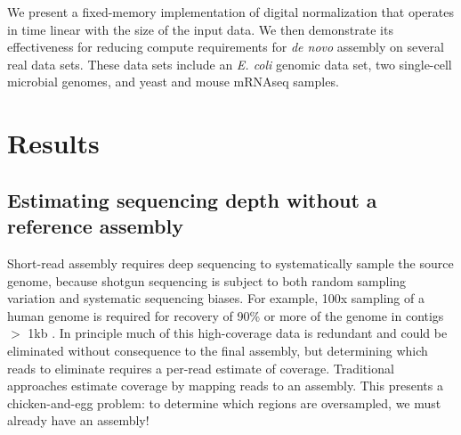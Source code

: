 \documentclass{pnastwo}
\begin{document}
\begin{article}


We present a fixed-memory implementation of digital normalization that
operates in time linear with the size of the input data.  We then
demonstrate its effectiveness for reducing compute requirements for
{\em de novo} assembly on several real data sets.  These data sets
include an {\em E. coli} genomic data set, two single-cell microbial
genomes, and yeast and mouse mRNAseq samples.

\section{Results}

\subsection*{Estimating sequencing depth without a reference assembly}

Short-read assembly requires deep sequencing to systematically sample
the source genome, because shotgun sequencing is subject to both
random sampling variation and systematic sequencing biases.  For
example, 100x sampling of a human genome is required for recovery of
90\% or more of the genome in contigs $>$ 1kb \cite{pubmed21187386}.
In principle much of this high-coverage data is redundant and could be
eliminated without consequence to the final assembly, but determining
which reads to eliminate requires a per-read estimate of coverage.
Traditional approaches estimate coverage by mapping reads to an
assembly.  This presents a chicken-and-egg problem: to
determine which regions are oversampled, we must already have an
assembly!


\end{article}
\end{document}
